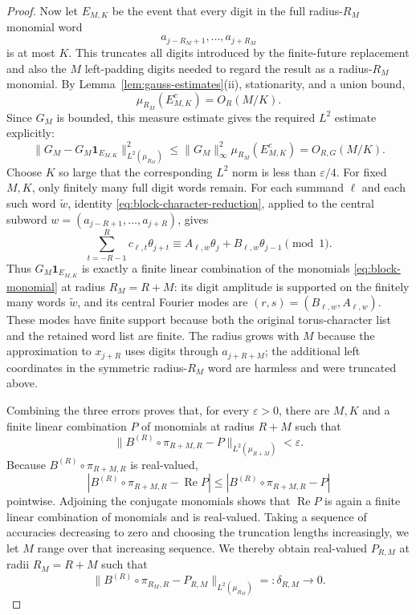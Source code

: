 \documentclass[11pt,a4paper]{amsart}
\theoremstyle{definition}
\theoremstyle{remark}
\newcommand{\ind}{\mathbf 1}
\begin{document}
\begin{proof}
Now let $E_{M,K}$ be the event that every digit in the full
radius-$R_M$ monomial word
\[
 a_{j-R_M+1},\ldots,a_{j+R_M}
\]
is at most $K$.  This truncates all digits introduced by the finite-future
replacement and also the $M$ left-padding digits needed to regard the result
as a radius-$R_M$ monomial.  By Lemma~\ref{lem:gauss-estimates}(ii),
stationarity, and a union bound,
\[
 \mu_{R_M}(E_{M,K}^c)=O_R(M/K).
\]
Since $G_M$ is bounded, this measure estimate gives the required $L^2$
estimate explicitly:
\[
 \|G_M-G_M\ind_{E_{M,K}}\|_{L^2(\mu_{R_M})}^2
 \le \|G_M\|_\infty^2\mu_{R_M}(E_{M,K}^c)
 =O_{R,G}(M/K).
\]
Choose $K$ so large that the corresponding $L^2$ norm is less than
$\varepsilon/4$.  For fixed $M,K$, only finitely many full digit words remain.
For each summand $\ell$ and each such word $\widetilde w$, identity
\eqref{eq:block-character-reduction}, applied to the central subword
$w=(a_{j-R+1},\ldots,a_{j+R})$, gives
\[
 \sum_{t=-R-1}^{R}c_{\ell,t}\theta_{j+t}
 \equiv A_{\ell,w}\theta_j+B_{\ell,w}\theta_{j-1}\pmod1.
\]
Thus $G_M\ind_{E_{M,K}}$ is exactly a finite linear combination of the
monomials \eqref{eq:block-monomial} at radius $R_M=R+M$: its digit amplitude
is supported on the finitely many words $\widetilde w$, and its central
Fourier modes are $(r,s)=(B_{\ell,w},A_{\ell,w})$.  These modes have finite
support because both the original torus-character list and the retained word
list are finite.
The radius grows with $M$ because the approximation to $x_{j+R}$ uses digits
through $a_{j+R+M}$; the additional left coordinates in the symmetric
radius-$R_M$ word are harmless and were truncated above.

Combining the three errors proves that, for every $\varepsilon>0$, there are
$M,K$ and a finite linear combination $P$ of monomials at radius $R+M$ such
that
\[
 \|B^{(R)}\circ\pi_{R+M,R}-P\|_{L^2(\mu_{R+M})}<\varepsilon.
\]
Because $B^{(R)}\circ\pi_{R+M,R}$ is real-valued,
\[
 |B^{(R)}\circ\pi_{R+M,R}-\operatorname{Re}P|
 \le |B^{(R)}\circ\pi_{R+M,R}-P|
\]
pointwise.  Adjoining the conjugate monomials shows that
$\operatorname{Re}P$ is again a finite linear combination of monomials and is
real-valued.  Taking a sequence of accuracies decreasing
to zero and choosing the truncation lengths increasingly, we let $M$ range
over that increasing sequence.  We thereby obtain real-valued $P_{R,M}$ at
radii $R_M=R+M$ such that
\begin{equation}\label{eq:remainder-L2-approx}
 \|B^{(R)}\circ\pi_{R_M,R}-P_{R,M}\|_{L^2(\mu_{R_M})}
 =:\delta_{R,M}\longrightarrow0.
\end{equation}


\end{proof}
\end{document}
